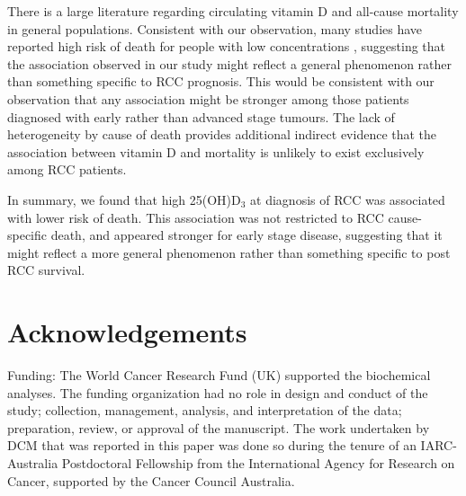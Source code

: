 \documentclass[a4paper,11pt]{article}
\begin{document}
There is a large literature regarding circulating vitamin D and all-cause 
mortality in general populations. Consistent with our observation, many studies 
have reported high risk of death for people with low concentrations 
\cite{schottker_strong_2013, virtanen_association_2011, hutchinson_low_2010, 
szulc_serum_2009, semba_low_2009, pilz_vitamin_2009, 
melamed_ml_25-hydroxyvitamin_2008, jia_nutritional_2007}, suggesting that 
the association observed in our study might reflect a general phenomenon rather 
than something specific to RCC prognosis. This would be consistent with our 
observation that any association might be stronger among those patients 
diagnosed with early rather than advanced stage tumours. The lack of 
heterogeneity by cause of death provides additional indirect evidence that the 
association between vitamin D and mortality is unlikely to exist exclusively 
among RCC patients. 

In summary, we found that high 25(OH)D$_3$ at diagnosis of RCC was associated 
with lower risk of death. This association was not restricted to RCC 
cause-specific death, and appeared stronger for early stage disease, suggesting 
that it might reflect a more general phenomenon rather than something 
specific to post RCC survival.  

\section*{Acknowledgements}
\noindent Funding:
The World Cancer Research Fund (UK) supported the biochemical analyses. The 
funding organization had no role in design and conduct of the study; collection, 
management, analysis, and interpretation of the data; preparation, review, or 
approval of the manuscript. The work undertaken by DCM that was reported in this 
paper was done so during the tenure of an IARC-Australia Postdoctoral Fellowship 
from the International Agency for Research on Cancer, supported by the Cancer 
Council Australia. 

\clearpage


\end{document}
